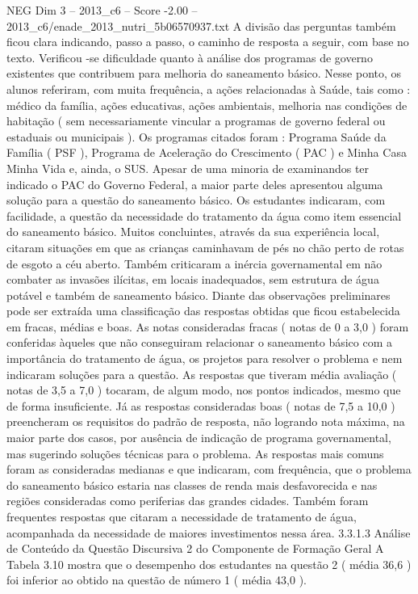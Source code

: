 \begin{textsample}{NEG Dim 3 – 2013\_c6 – Score -2.00 – 2013\_c6/enade\_2013\_nutri\_5b06570937.txt}
A divisão das perguntas também ficou clara indicando, passo a passo, o caminho de resposta a seguir, com base no texto.
Verificou -se dificuldade quanto à análise dos programas de governo existentes que contribuem para melhoria do saneamento básico.
Nesse ponto, os alunos referiram, com muita frequência, a ações relacionadas à Saúde, tais como : médico da família, ações educativas, ações ambientais, melhoria nas condições de habitação ( sem necessariamente vincular a programas de governo federal ou estaduais ou municipais ).
Os programas citados foram : Programa Saúde da Família ( PSF ), Programa de Aceleração do Crescimento ( PAC ) e Minha Casa Minha Vida e, ainda, o SUS.
Apesar de uma minoria de examinandos ter indicado o PAC do Governo Federal, a maior parte deles apresentou alguma solução para a questão do saneamento básico.
Os estudantes indicaram, com facilidade, a questão da necessidade do tratamento da água como item essencial do saneamento básico.
Muitos concluintes, através da sua experiência local, citaram situações em que as crianças caminhavam de pés no chão perto de rotas de esgoto a céu aberto.
Também criticaram a inércia governamental em não combater as invasões ilícitas, em locais inadequados, sem estrutura de água potável e também de saneamento básico.
Diante das observações preliminares pode ser extraída uma classificação das respostas obtidas que ficou estabelecida em fracas, médias e boas.
As notas consideradas fracas ( notas de 0 a 3,0 ) foram conferidas àqueles que não conseguiram relacionar o saneamento básico com a importância do tratamento de água, os projetos para resolver o problema e nem indicaram soluções para a questão.
As respostas que tiveram média avaliação ( notas de 3,5 a 7,0 ) tocaram, de algum modo, nos pontos indicados, mesmo que de forma insuficiente.
Já as respostas consideradas boas ( notas de 7,5 a 10,0 ) preencheram os requisitos do padrão de resposta, não logrando nota máxima, na maior parte dos casos, por ausência de indicação de programa governamental, mas sugerindo soluções técnicas para o problema.
As respostas mais comuns foram as consideradas medianas e que indicaram, com frequência, que o problema do saneamento básico estaria nas classes de renda mais desfavorecida e nas regiões consideradas como periferias das grandes cidades.
Também foram frequentes respostas que citaram a necessidade de tratamento de água, acompanhada da necessidade de maiores investimentos nessa área. 3.3.1.3 Análise de Conteúdo da Questão Discursiva 2 do Componente de Formação Geral A Tabela 3.10 mostra que o desempenho dos estudantes na questão 2 ( média 36,6 ) foi inferior ao obtido na questão de número 1 ( média 43,0 ).

\end{textsample}
